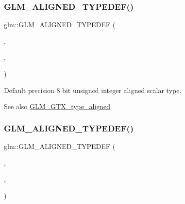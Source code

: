 \subsubsection{\texorpdfstring{G\+L\+M\+\_\+\+A\+L\+I\+G\+N\+E\+D\+\_\+\+T\+Y\+P\+E\+D\+E\+F()}{GLM\_ALIGNED\_TYPEDEF()}\hspace{0.1cm}{\footnotesize\ttfamily [121/209]}}
{\footnotesize\ttfamily glm\+::\+G\+L\+M\+\_\+\+A\+L\+I\+G\+N\+E\+D\+\_\+\+T\+Y\+P\+E\+D\+EF (\begin{DoxyParamCaption}\item[{\hyperlink{group__gtc__type__precision_ga024be724ff45865952190522b03fc0d5}{u8vec1}}]{,  }\item[{aligned\+\_\+u8vec1}]{,  }\item[{1}]{ }\end{DoxyParamCaption})}

Default precision 8 bit unsigned integer aligned scalar type. \begin{DoxySeeAlso}{See also}
\hyperlink{group__gtx__type__aligned}{G\+L\+M\+\_\+\+G\+T\+X\+\_\+type\+\_\+aligned} 
\end{DoxySeeAlso}
\mbox{\label{group__gtx__type__aligned_ga19837e6f72b60d994a805ef564c6c326}} 
\subsubsection{\texorpdfstring{G\+L\+M\+\_\+\+A\+L\+I\+G\+N\+E\+D\+\_\+\+T\+Y\+P\+E\+D\+E\+F()}{GLM\_ALIGNED\_TYPEDEF()}\hspace{0.1cm}{\footnotesize\ttfamily [122/209]}}
{\footnotesize\ttfamily glm\+::\+G\+L\+M\+\_\+\+A\+L\+I\+G\+N\+E\+D\+\_\+\+T\+Y\+P\+E\+D\+EF (\begin{DoxyParamCaption}\item[{\hyperlink{group__gtc__type__precision_ga1c259b876f8757eb197b83a5fab476f0}{u8vec2}}]{,  }\item[{aligned\+\_\+u8vec2}]{,  }\item[{2}]{ }\end{DoxyParamCaption})}

